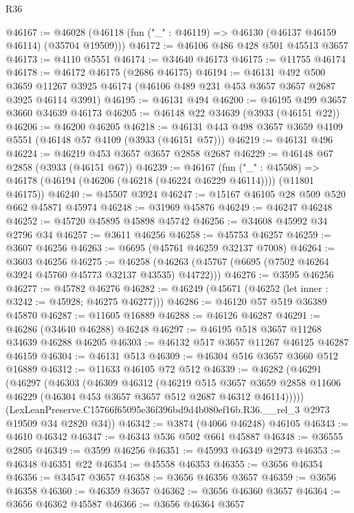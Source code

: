 \begin{lexlean}{R36}
\begin{coremodule}
@46167 := @46028 (@46118 (fun ("_" : @46119) => @46130 (@46137 @46159 @46114) (@35704 @19509)))
@46172 := @46106 @486 @428 @501 @45513 @3657
@46173 := @4110 @5551
@46174 := @34640 @46173
@46175 := @11755 @46174
@46178 := @46172 @46175 (@2686 @46175)
@46194 := @46131
    @492
    @500
    @3659
    @11267
    @3925
    @46174
    (@46106 @489 @231 @453 @3657 @3657 @2687 @3925 @46114 @3991)
@46195 := @46131 @494
@46200 := @46195 @499 @3657 @3660 @34639 @46173
@46205 := @46148 @22 @34639 (@3933 (@46151 @22))
@46206 := @46200 @46205
@46218 := @46131 @443 @498 @3657 @3659 @4109 @5551 (@46148 @57 @4109 (@3933 (@46151 @57)))
@46219 := @46131 @496
@46224 := @46219 @453 @3657 @3657 @2858 @2687
@46229 := @46148 @67 @2858 (@3933 (@46151 @67))
@46239 := @46167
    (fun ("_" : @45508) => @46178 (@46194 (@46206 (@46218 (@46224 @46229 @46114)))) (@11801 @46175))
@46240 := @45507 @3924
@46247 := @15167 @46105 @28 @509 @520 @662 @45871 @45974
@46248 := @31969 @45876
@46249 := @46247 @46248
@46252 := @45720 @45895 @45898 @45742
@46256 := @34608 @45992 @34 @2796 @34
@46257 := @3611 @46256
@46258 := @45753 @46257
@46259 := @3607 @46256
@46263 := @6695 (@45761 @46259 @32137 @7008)
@46264 := @3603 @46256
@46275 := @46258 (@46263 (@45767 (@6695 (@7502 @46264 @3924 @45760 @45773 @32137 @43535) @44722)))
@46276 := @3595 @46256
@46277 := @45782 @46276
@46282 := @46249 (@45671 (@46252 (let inner : @3242 := @45928; @46275 @46277)))
@46286 := @46120 @57 @519 @36389 @45870
@46287 := @11605 @16889
@46288 := @46126 @46287
@46291 := @46286 (@34640 @46288) @46248
@46297 := @46195 @518 @3657 @11268 @34639 @46288 @46205
@46303 := @46132 @517 @3657 @11267 @46125 @46287 @46159
@46304 := @46131 @513
@46309 := @46304 @516 @3657 @3660 @512 @16889
@46312 := @11633 @46105 @72 @512
@46339 := @46282
    (@46291
      (@46297
        (@46303
          (@46309
            @46312
            (@46219
              @515
              @3657
              @3659
              @2858
              @11606
              @46229
              (@46304 @453 @3657 @3657 @512 @2687 @46312 @46114)))))
      (LexLeanPreserve.C15766f65095e36f396bd9d4b080ef16b.R36.__rel_3 @2973 @19509 @34 @2820 @34))
@46342 := @3874 (@4066 @46248) @46105
@46343 := @4610 @46342
@46347 := @46343 @536 @502 @661 @45887
@46348 := @36555 @2805
@46349 := @3599 @46256
@46351 := @45993 @46349 @2973
@46353 := @46348 @46351 @22
@46354 := @45558 @46353
@46355 := @3656 @46354
@46356 := @34547 @3657
@46358 := @3656 @46356 @3657
@46359 := @3656 @46358
@46360 := @46359 @3657
@46362 := @3656 @46360 @3657
@46364 := @3656 @46362 @45587
@46366 := @3656 @46364 @3657

\end{coremodule}
\end{lexlean}
